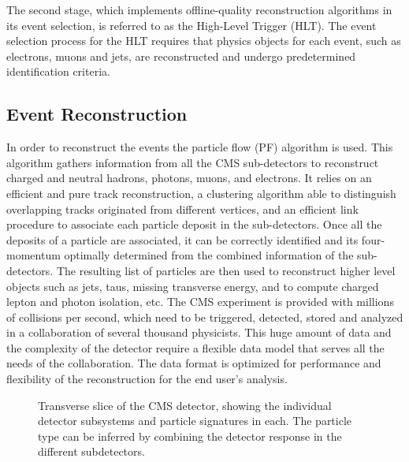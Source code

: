 The second stage, which implements offline-quality reconstruction algorithms in its event selection, is referred to as the High-Level Trigger (HLT)\cite{HLT}. The event selection process for the HLT requires that physics objects for each event, such as electrons, muons and jets, are reconstructed and undergo predetermined identification criteria. 

\subsection{Event Reconstruction}

In order to reconstruct the events the particle flow (PF) algorithm\cite{PFref} is used. This algorithm gathers information from all the CMS sub-detectors to reconstruct charged and neutral hadrons, photons, muons, and electrons. It relies on an efficient and pure track reconstruction, a clustering algorithm able to distinguish overlapping tracks originated from different vertices, and an efficient link procedure to associate each particle deposit in the sub-detectors. Once all the deposits of a particle are associated, it can be correctly identified and its four-momentum optimally determined from the combined information of the sub-detectors. The resulting list of particles are then used to reconstruct higher level objects such as jets, taus, missing transverse energy, and to compute charged lepton and photon isolation, etc\cite{Reco1}. The CMS experiment is provided with millions of collisions per second, which need to be triggered, detected, stored and analyzed in a collaboration of several thousand physicists. This huge amount of data and the complexity of the detector require a flexible data model that serves all the needs of the collaboration. The data format is optimized for performance and flexibility of the reconstruction for the end user's analysis.\\

\begin{figure}[tb]
\begin{center}
\caption{Transverse slice of the CMS detector, showing the individual detector subsystems and particle signatures in each. The particle type can be inferred by combining the detector response in the different subdetectors\cite{CMSslice}.}
\label{CMSParticleDet} 
\end{center}
\end{figure}

